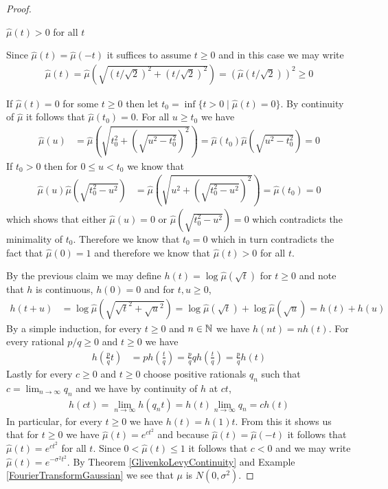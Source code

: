 \begin{proof}
\begin{clm}$\hat{\mu}(t) > 0$ for all $t$
\end{clm}
Since $\hat{\mu}(t) = \hat{\mu}(-t)$ it suffices to assume $t \geq 0$ and in this case we may write 
\begin{align*}
\hat{\mu}(t) = \hat{\mu}(\sqrt{(t/\sqrt{2})^2 + (t/\sqrt{2})^2}) = \left(\hat{\mu}(t/\sqrt{2})\right)^2 \geq 0
\end{align*}

If $\hat{\mu}(t) = 0$ for some $t \geq 0$ then let $t_0 = \inf \lbrace t > 0 \mid \hat{\mu}(t) = 0 \rbrace$.  By continuity of $\hat{\mu}$ it follows that
$\hat{\mu}(t_0) = 0$.  For all $u \geq t_0$ we have 
\begin{align*}
\hat{\mu}(u) &= \hat{\mu}(\sqrt{t_0^2 + (\sqrt{u^2 - t_0^2})^2}) = \hat{\mu}(t_0) \hat{\mu}(\sqrt{u^2 - t_0^2}) = 0 
\end{align*}
If $t_0 > 0$ then for $0 \leq u < t_0$ we know that 
\begin{align*}
\hat{\mu}(u) \hat{\mu}(\sqrt{t_0^2 - u^2}) &= \hat{\mu}(\sqrt{u^2 + (\sqrt{t_0^2 - u^2})^2}) = \hat{\mu}(t_0) = 0
\end{align*}
which shows that either $\hat{\mu}(u)=0$ or $\hat{\mu}(\sqrt{t_0^2 - u^2})=0$ which contradicts the minimality of $t_0$.  Therefore we know that $t_0=0$ which in turn
contradicts the fact that $\hat{\mu}(0) = 1$ and therefore we know that $\hat{\mu} (t) > 0$ for all $t$.

By the previous claim we may define $h(t) =  \log \hat{\mu}(\sqrt{t})$ for $t \geq 0$ and note that $h$ is continuous, $h(0) = 0$ and for $t,u \geq 0$,
\begin{align*}
h(t+u) &= \log \hat{\mu}(\sqrt{\sqrt{t}^2 + \sqrt{u}^2}) = \log \hat{\mu}(\sqrt{t}) + \log \hat{\mu}(\sqrt{u}) = h(t) + h(u)
\end{align*}
By a simple induction, for every $t \geq 0$ and $n \in \mathbb{N}$ we have $h(nt) = nh(t)$.  For every rational $p/q \geq 0$ and $t \geq 0$ we have
\begin{align*}
h(\frac{p}{q} t) &= p h(\frac{t}{q}) = \frac{p}{q} q h(\frac{t}{q})  = \frac{p}{q} h(t)
\end{align*}
Lastly for every $c \geq 0$ and $t \geq 0$ choose positive rationals $q_n$ such that $c = \lim_{n\to \infty} q_n$ and we have by continuity of $h$ at $c t$, 
\begin{align*}
h(ct) = \lim_{n \to \infty} h(q_n t) = h(t) \lim_{n \to \infty} q_n = c h(t)
\end{align*}
In particular, for every $t \geq 0$ we have $h(t) = h(1) t$.  From this it shows us that for $t \geq 0$ we have $\hat{\mu}(t) = e^{ct^2}$ and because $\hat{\mu}(t)=\hat{\mu}(-t)$ it follows that
$\hat{\mu}(t) = e^{ct^2}$ for all $t$.  Since $0 < \hat{\mu}(t) \leq 1$ it follows that $c < 0$ and we may write $\hat{\mu}(t) = e^{-\sigma^2 t^2}$. By Theorem \ref{GlivenkoLevyContinuity} and Example \ref{FourierTransformGaussian} we see that $\mu$ is $N(0, \sigma^2)$.  
\end{proof}

